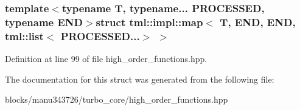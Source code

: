 \subsubsection*{template$<$typename T, typename... P\+R\+O\+C\+E\+S\+S\+E\+D, typename E\+N\+D$>$struct tml\+::impl\+::map$<$ T, E\+N\+D, E\+N\+D, tml\+::list$<$ P\+R\+O\+C\+E\+S\+S\+E\+D...$>$ $>$}



Definition at line 99 of file high\+\_\+order\+\_\+functions.\+hpp.



The documentation for this struct was generated from the following file\+:\begin{DoxyCompactItemize}
\item 
blocks/manu343726/turbo\+\_\+core/high\+\_\+order\+\_\+functions.\+hpp\end{DoxyCompactItemize}
